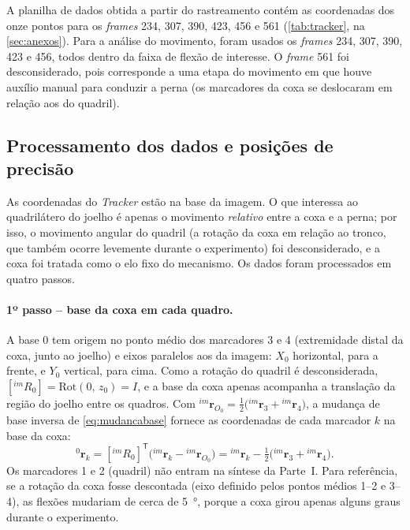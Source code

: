 \documentclass[12pt,a4paper,twoside]{article}
\newcommand{\rv}[2]{{}^{#1}\mathbf{r}_{#2}}          %
\newcommand{\Rm}[2]{[{}^{#1}R_{#2}]}                 %
\newcommand{\Rot}[2]{\mathrm{Rot}(#1,\,#2)}
\numberwithin{equation}{section}
\begin{document}
A planilha de dados obtida a partir do rastreamento contém as coordenadas dos onze
pontos para os \emph{frames} 234, 307, 390, 423, 456 e 561 (\cref{tab:tracker}, na
\cref{sec:anexos}). Para a análise do movimento, foram usados os \emph{frames}
234, 307, 390, 423 e 456, todos dentro da faixa de flexão de interesse. O \emph{frame} 561
foi desconsiderado, pois corresponde a uma etapa do movimento em que houve auxílio manual
para conduzir a perna (os marcadores da coxa se deslocaram em relação aos do quadril).

\subsection{Processamento dos dados e posições de precisão}\label{sec:processamento}

As coordenadas do \emph{Tracker} estão na base da imagem. O que interessa ao
quadrilátero do joelho é apenas o movimento \emph{relativo} entre a coxa e a perna; por
isso, o movimento angular do quadril (a rotação da coxa em relação ao tronco, que
também ocorre levemente durante o experimento) foi desconsiderado, e a coxa foi tratada
como o elo fixo do mecanismo. Os dados foram processados em quatro passos.

\paragraph{1º passo -- base da coxa em cada quadro.} A base $0$ tem origem no ponto médio
dos marcadores 3 e 4 (extremidade distal da coxa, junto ao joelho) e eixos paralelos aos
da imagem: $X_0$ horizontal, para a frente, e $Y_0$ vertical, para cima. Como a rotação
do quadril é desconsiderada, $\Rm{im}{0} = \Rot{0}{z_0} = I$, e a base da coxa apenas
acompanha a translação da região do joelho entre os quadros. Com
$\rv{im}{O_0} = \tfrac12\big(\rv{im}{3} + \rv{im}{4}\big)$, a mudança de base inversa de
\eqref{eq:mudancabase} fornece as coordenadas de cada marcador $k$ na base da coxa:
\begin{equation}
  \rv{0}{k} = \Rm{im}{0}^{\mathsf T}\big(\rv{im}{k} - \rv{im}{O_0}\big) = \rv{im}{k} - \tfrac12\big(\rv{im}{3} + \rv{im}{4}\big).
\end{equation}
Os marcadores 1 e 2 (quadril) não entram na síntese da Parte~I. Para referência, se a
rotação da coxa fosse descontada (eixo definido pelos pontos médios 1--2 e 3--4), as
flexões mudariam de cerca de \SI{5}{\degree}, porque a coxa girou apenas alguns graus durante
o experimento.
\end{document}
